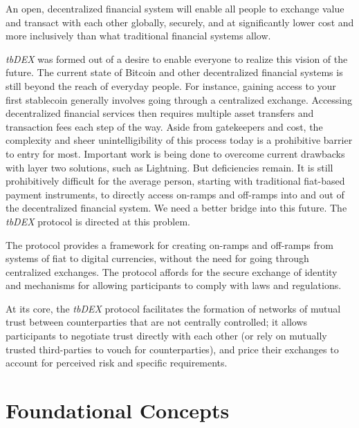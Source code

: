 \documentclass[11pt]{article}
\begin{document}
\vspace{1\baselineskip}
An open, decentralized financial system will enable all people to exchange value and transact with each other globally, securely, and at significantly lower cost and more inclusively than what traditional financial systems allow.

\vspace{1\baselineskip}
\textit{tbDEX }was formed out of a desire to enable everyone to realize this vision of the future.  The current state of Bitcoin and other decentralized financial systems is still beyond the reach of everyday people. For instance, gaining access to your first stablecoin generally involves going through a centralized exchange. Accessing decentralized financial services then requires multiple asset transfers and transaction fees each step of the way. Aside from gatekeepers and cost, the complexity and sheer unintelligibility of this process today is a prohibitive barrier to entry for most. Important work is being done to overcome current drawbacks with layer two solutions, such as Lightning. But deficiencies remain. It is still prohibitively difficult for the average person, starting with traditional fiat-based payment instruments, to directly access on-ramps and off-ramps into and out of the decentralized financial system. We need a better bridge into this future. The \textit{tbDEX} protocol is directed at this problem.

\vspace{1\baselineskip}
The protocol provides a framework for creating on-ramps and off-ramps from systems of fiat to digital currencies, without the need for going through centralized exchanges. The protocol affords for the secure exchange of identity and mechanisms for allowing participants to comply with laws and regulations. 

\vspace{1\baselineskip}
At its core, the \textit{tbDEX} protocol facilitates the formation of networks of mutual trust between counterparties that are not centrally controlled; it allows participants to negotiate trust directly with each other (or rely on mutually trusted third-parties to vouch for counterparties), and price their exchanges to account for perceived risk and specific requirements. 

\vspace{1\baselineskip}
\section{Foundational Concepts}
\end{document}
